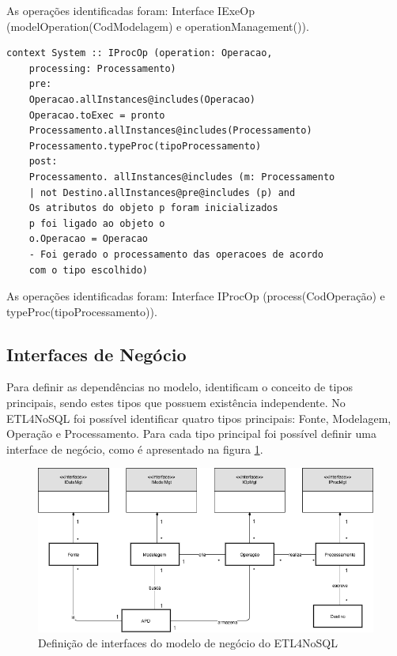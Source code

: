 As operações identificadas foram: Interface IExeOp (modelOperation(CodModelagem) e operationManagement()).

\begin{lstlisting}[frame=single, language=Oberon-2, basicstyle=\small]
	context System :: IProcOp (operation: Operacao, 
	processing: Processamento)	
	pre:
	Operacao.allInstances@includes(Operacao) 
	Operacao.toExec = pronto	
	Processamento.allInstances@includes(Processamento) 
	Processamento.typeProc(tipoProcessamento)	
	post:		
	Processamento. allInstances@includes (m: Processamento 
	| not Destino.allInstances@pre@includes (p) and	
	Os atributos do objeto p foram inicializados
	p foi ligado ao objeto o
	o.Operacao = Operacao
	- Foi gerado o processamento das operacoes de acordo 
	com o tipo escolhido)

\end{lstlisting}

As operações identificadas foram: Interface IProcOp (process(CodOperação) e typeProc(tipoProcessamento)).

\subsection{Interfaces de Negócio}

Para definir as dependências no modelo, \cite{cheesman:2001} identificam o conceito de tipos principais, sendo estes tipos que possuem existência independente.
No ETL4NoSQL foi possível identificar quatro tipos principais: Fonte, Modelagem, Operação e Processamento. Para cada tipo principal foi possível definir uma interface de negócio, como é apresentado na figura \ref{modelo_negocio}.

\begin{figure}[h]
	\centering
	\includegraphics[scale=0.58]{fig/modelo_negocio.png}
	\caption{Definição de interfaces do modelo de negócio do ETL4NoSQL}
	\label{modelo_negocio}
\end{figure}

